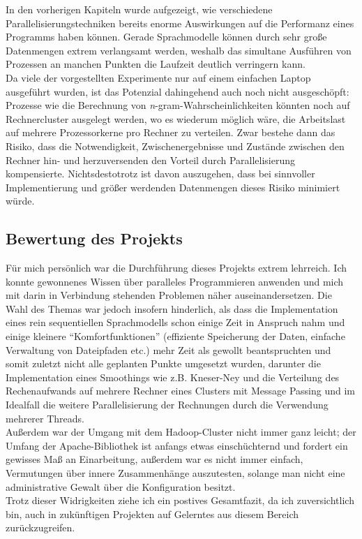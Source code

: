\documentclass[a4paper,12pt]{scrartcl}
\begin{document}
    In den vorherigen Kapiteln wurde aufgezeigt, wie verschiedene Parallelisierungstechniken bereits enorme Auswirkungen auf die Performanz eines Programms haben können. Gerade Sprachmodelle können durch sehr große Datenmengen extrem verlangsamt werden, weshalb das simultane Ausführen von Prozessen an manchen Punkten die Laufzeit deutlich verringern kann. \\
    Da viele der vorgestellten Experimente nur auf einem einfachen Laptop ausgeführt wurden, ist das Potenzial dahingehend auch noch nicht ausgeschöpft: Prozesse wie die Berechnung von \emph{n}-gram-Wahrscheinlichkeiten könnten noch auf Rechnercluster ausgelegt werden, wo es wiederum möglich wäre, die Arbeitslast auf mehrere Prozessorkerne pro Rechner zu verteilen. Zwar bestehe dann das Risiko, dass die Notwendigkeit, Zwischenergebnisse und Zustände zwischen den Rechner hin- und herzuversenden den Vorteil durch Parallelisierung kompensierte. Nichtsdestotrotz ist davon auszugehen, dass bei sinnvoller Implementierung und größer werdenden Datenmengen dieses Risiko minimiert würde.

    \subsection{Bewertung des Projekts}

    Für mich persönlich war die Durchführung dieses Projekts extrem lehrreich. Ich konnte gewonnenes Wissen über paralleles Programmieren anwenden und mich mit darin in Verbindung stehenden Problemen näher auseinandersetzen. Die Wahl des Themas war jedoch insofern hinderlich, als dass die Implementation eines rein sequentiellen Sprachmodells schon einige Zeit in Anspruch nahm und einige kleinere ``Komfortfunktionen'' (effiziente Speicherung der Daten, einfache Verwaltung von Dateipfaden etc.) mehr Zeit als gewollt beantspruchten und somit zuletzt nicht alle geplanten Punkte umgesetzt wurden, darunter die Implementation eines Smoothings wie z.B. Kneser-Ney und die Verteilung des Rechenaufwands auf mehrere Rechner eines Clusters mit Message Passing und im Idealfall die weitere Parallelisierung der Rechnungen durch die Verwendung mehrerer Threads. \\
    Außerdem war der Umgang mit dem Hadoop-Cluster nicht immer ganz leicht; der Umfang der Apache-Bibliothek ist anfangs etwas einschüchternd und fordert ein gewisses Maß an Einarbeitung, außerdem war es nicht immer einfach, Vermutungen über innere Zusammenhänge auszutesten, solange man nicht eine administrative Gewalt über die Konfiguration besitzt.\\

    Trotz dieser Widrigkeiten ziehe ich ein postives Gesamtfazit, da ich zuversichtlich bin, auch in zukünftigen Projekten auf Gelerntes aus diesem Bereich zurückzugreifen.



\clearpage

\onehalfspacing

\pagestyle{plain}


\clearpage
\nocite{*}
{}

\end{document}
